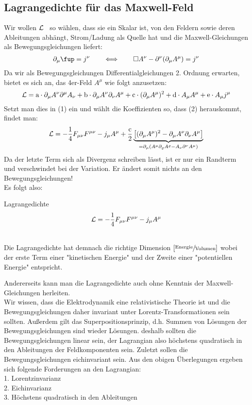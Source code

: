 \subsection{Lagrangedichte für das Maxwell-Feld}
Wir wollen $\mathcal{L}$ \ so wählen, dass sie ein Skalar ist, von den Feldern sowie deren Ableitungen abhängt, Strom/Ladung als Quelle hat und die Maxwell-Gleichungen als Bewegungsgleichungen liefert:
\begin{align}
\partial_{\mu}\fup = j^{\nu} \qquad  \Longleftrightarrow \qquad \Box A^{\nu} - \partial^{\nu}(\partial_{\mu}A^{\mu}) = j^{\nu}
\end{align}
Da wir als Bewegungsgleichungen Differentialgleichungen 2. Ordnung erwarten, bietet es sich an, das 4er-Feld $A^{\mu}$ wie folgt anzusetzen:
\begin{align*}
\mathcal{L} = \text{a} \cdot \partial_{\mu}A^{\nu}\partial^{\mu}A_{\nu} + \text{b} \cdot \partial_{\mu}A^{\nu}\partial_{\nu}A^{\mu} + \text{c} \cdot (\partial_{\mu}A^{\mu})^2 + \text{d} \cdot A_{\mu}A^{\mu} + \text{e} \cdot A_{\mu}j^{\mu}
\end{align*}
Setzt man dies in (1) ein und wählt die Koeffizienten so, dass (2) herauskommt, findet man:
\begin{align*}
\mathcal{L} = -\frac{1}{4} F_{\mu \nu} F^{\mu \nu} - j_{\mu}A^{\mu} + \frac{\text{c}}{2} \underbrace{\left[ (\partial_{\mu}A^{\mu})^2 - \partial_{\mu}A^{\nu}\partial_{\nu}A^{\mu} \right]}_{= \partial_{\mu}(A^{\mu}\partial_{\varrho}A^{\varrho}-A_{\nu}\partial^{\nu}A^{\mu})}
\end{align*}
Da der letzte Term sich als Divergenz schreiben lässt, ist er nur ein Randterm und verschwindet bei der Variation. Er ändert somit nichts an den Bewegungsgleichungen! \\ 
Es folgt also:
\begin{mybox}{Lagrangedichte}
\begin{align}
\mathcal{L} = -\frac{1}{4} F_{\mu \nu} F^{\mu \nu} - j_{\mu}A^{\mu}
\end{align}
\end{mybox}
\phantom{.} \\
Die Lagrangedichte hat demnach die richtige Dimension $\left[\sfrac{\text{Energie}}{\text{Volumen}}\right]$ wobei der erste Term einer "kinetischen Energie" und der Zweite einer "potentiellen Energie" entspricht.

Andererseits kann man die Lagrangedichte auch ohne Kenntnis der Maxwell-Gleichungen herleiten. \\
Wir wissen, dass die Elektrodynamik eine relativistische Theorie ist und die Bewegungsgleichungen daher invariant unter Lorentz-Transformationen sein sollten. Außerdem gilt das Superpositionsprinzip, d.h. Summen von Lösungen der Bewegungsgleichungen sind wieder Lösungen. deshalb sollten die Bewegungsgleichungen linear sein, der Lagrangian also höchstens quadratisch in den Ableitungen der Feldkomponenten sein. Zuletzt sollen die Bewegungsgleichungen eichinvariant sein.
Aus den obigen Überlegungen ergeben sich folgende Forderungen an den Lagrangian: \\
1. Lorentzinvarianz \\
2. Eichinvarianz  \\
3. Höchstens quadratisch in den Ableitungen \\

